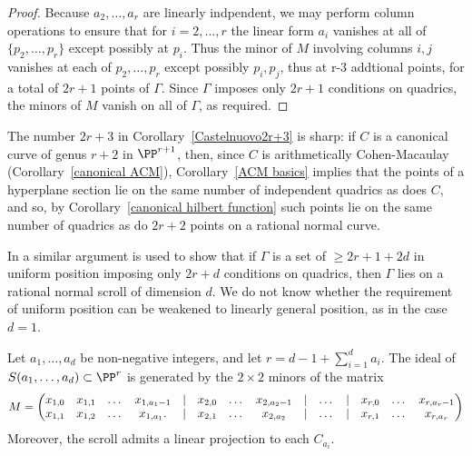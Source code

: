 \begin{proof}
Because $a_2,\dots, a_r$ are linearly indpendent,
we may perform column operations to ensure that for $i=2, \dots, r$ the linear form
$a_i$ vanishes at all of $\{p_2,\dots, p_{r}\}$ except possibly at $p_i$.
Thus the minor of $M$ involving columns $i,j$ vanishes at each of $p_2,\dots, p_r$ except possibly
$p_i,p_j$, thus at r-3 addtional points, for a total of $2r+1$ points of $\Gamma$. Since
$\Gamma$ imposes only $2r+1$ conditions on quadrics, the minors of $M$ vanish on all of $\Gamma$,
as required. 
\end{proof}

 The number $2r+3$ in Corollary~\ref{Castelnuovo2r+3} is sharp: if $C$ is a canonical curve of genus $r+2$ in $\PP^{r+1}$, then, since $C$
 is arithmetically Cohen-Macaulay (Corollary~\ref{canonical ACM}), Corollary~\ref{ACM basics} implies that the points of a hyperplane 
 section lie on the same number of independent quadrics as does $C$, and so,
 by Corollary~\ref{canonical hilbert function} such points lie on the same number of
 quadrics as do $2r+2$ points on a rational normal curve.

\begin{fact}
In \cite{MR685427} a similar argument is used to show that if $\Gamma$ is a set of $\geq 2r+1+2d$ in uniform position
imposing only
$2r+d$ conditions on quadrics, then $\Gamma$ lies on a rational normal scroll of dimension $d$.
We do not know whether the requirement of uniform position can be weakened to linearly general position,
as in the case $d=1$.
\end{fact}
 
\begin{corollary}\label{equations of scrolls} Let $a_{1}, \dots, a_{d}$ be non-negative integers, and let 
$r = d-1+\sum_{i=1}^{d} a_{i}$.
The ideal of $S(a_{1},\dots,a_{d})\subset \PP^{r}$ is generated by the $2\times 2$ minors of the matrix
{\footnotesize
$$
\setcounter{MaxMatrixCols}{20}
M = \begin{pmatrix}
x_{1,0}&x_{1,1}&\dots&x_{1, a_{1}-1}&|&x_{2,0}&\dots&x_{2, a_{2}-1}&|&\dots&|&x_{r,0}&\dots&x_{r, a_{r}-1}\\
x_{1,1}&x_{1,2}&\dots&x_{1, a_{1}}.  &|&x_{2,1}&\dots&x_{2, a_{2}}&|&\dots&|&x_{r,1}&\dots&x_{r, a_{r}}
\end{pmatrix}
$$
}
Moreover, the scroll admits a linear projection to each $C_{a_i}$.
\end{corollary}


